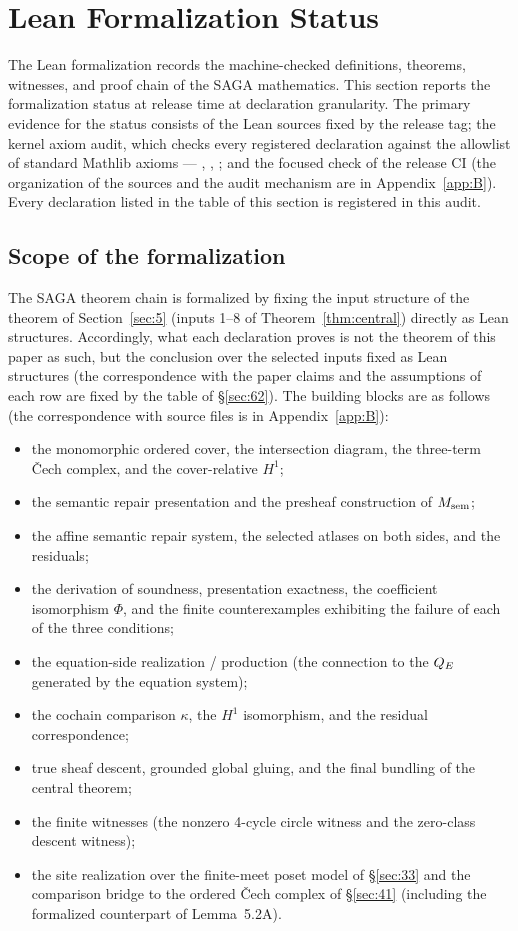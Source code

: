 \section{Lean Formalization Status}\label{sec:6}

The Lean formalization records the machine-checked definitions,
theorems, witnesses, and proof chain of the SAGA mathematics. This
section reports the formalization status at release time at declaration
granularity. The primary evidence for the status consists of the Lean
sources fixed by the release tag; the kernel axiom audit, which checks
every registered declaration against the allowlist of standard Mathlib
axioms --- , , ;
and the focused check of the release CI (the organization of the
sources and the audit mechanism are in Appendix~\ref{app:B}). Every
declaration listed in the table of this section is registered in this
audit.

\subsection{Scope of the formalization}\label{sec:61}

The SAGA theorem chain is formalized by fixing the input structure of
the theorem of Section~\ref{sec:5} (inputs 1--8 of
Theorem~\ref{thm:central}) directly as Lean structures. Accordingly,
what each declaration proves is not the theorem of this paper as such,
but the conclusion over the selected inputs fixed as Lean structures
(the correspondence with the paper claims and the assumptions of each
row are fixed by the table of \S\ref{sec:62}). The building blocks are
as follows (the correspondence with source files is in
Appendix~\ref{app:B}):
\begin{itemize}
\item the monomorphic ordered cover, the intersection diagram, the
three-term \v{C}ech complex, and the cover-relative $H^1$;
\item the semantic repair presentation and the presheaf construction
of $M_{\mathrm{sem}}$;
\item the affine semantic repair system, the selected atlases on both
sides, and the residuals;
\item the derivation of soundness, presentation exactness, the
coefficient isomorphism $\Phi$, and the finite counterexamples exhibiting
the failure of each of the three conditions;
\item the equation-side realization / production (the connection to
the $Q_{E}$ generated by the equation system);
\item the cochain comparison $\kappa$, the $H^1$ isomorphism, and the
residual correspondence;
\item true sheaf descent, grounded global gluing, and the final
bundling of the central theorem;
\item the finite witnesses (the nonzero 4-cycle circle witness and the
zero-class descent witness);
\item the site realization over the finite-meet poset model of
\S\ref{sec:33} and the comparison bridge to the ordered \v{C}ech
complex of \S\ref{sec:41} (including the formalized counterpart of
Lemma~5.2A).
\end{itemize}

